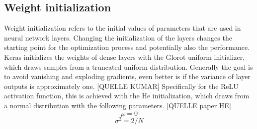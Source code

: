 \documentclass{article}
\begin{document}
\subsection{Weight initialization}
Weight initialization refers to the initial values of parameters that are used in neural network layers.
Changing the initialization of the layers changes the starting point for the optimization process and potentially also the performance.
Keras initializes the weights of dense layers with the Glorot uniform initializer, which draws samples from a truncated uniform distribution.
Generally the goal is to avoid vanishing and exploding gradients, even better is if the variance of layer outputs is approximately one. [QUELLE KUMAR]
Specifically for the ReLU activation function, this is achieved with the He initialization, which draws from a normal distribution with the following parameters. [QUELLE paper HE]\\
  \begin{equation}
    \mu = 0
  \end{equation}
  \begin{equation}
    \sigma^2 = 2/N
  \end{equation}
\end{document}
